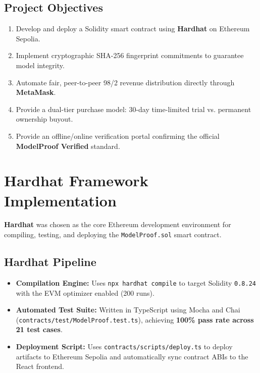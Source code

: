 \documentclass[12pt,a4paper]{article}
\begin{document}
\subsection{Project Objectives}
\begin{enumerate}
    \item Develop and deploy a Solidity smart contract using \textbf{Hardhat} on Ethereum Sepolia.
    \item Implement cryptographic SHA-256 fingerprint commitments to guarantee model integrity.
    \item Automate fair, peer-to-peer 98/2 revenue distribution directly through \textbf{MetaMask}.
    \item Provide a dual-tier purchase model: 30-day time-limited trial vs. permanent ownership buyout.
    \item Provide an offline/online verification portal confirming the official \textbf{ModelProof Verified\texttrademark} standard.
\end{enumerate}

\section{Hardhat Framework Implementation}

\textbf{Hardhat} was chosen as the core Ethereum development environment for compiling, testing, and deploying the \texttt{ModelProof.sol} smart contract.

\subsection{Hardhat Pipeline}
\begin{itemize}[leftmargin=1.5em]
    \item \textbf{Compilation Engine:} Uses \texttt{npx hardhat compile} to target Solidity \texttt{0.8.24} with the EVM optimizer enabled (200 runs).
    \item \textbf{Automated Test Suite:} Written in TypeScript using Mocha and Chai (\texttt{contracts/test/ModelProof.test.ts}), achieving \textbf{100\% pass rate across 21 test cases}.
    \item \textbf{Deployment Script:} Uses \texttt{contracts/scripts/deploy.ts} to deploy artifacts to Ethereum Sepolia and automatically sync contract ABIs to the React frontend.
\end{itemize}
\end{document}
